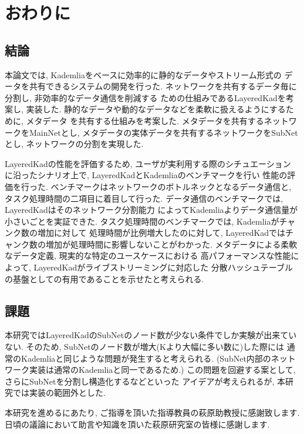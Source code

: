 \documentclass[sotsuron]{jcsie}
\begin{document}

\chapter{おわりに}
\section{結論}
本論文では, Kademliaをベースに効率的に静的なデータやストリーム形式の
データを共有できるシステムの開発を行った.
ネットワークを共有するデータ毎に分割し, 非効率的なデータ通信を削減する
ための仕組みであるLayeredKadを考案し, 実装した.
静的なデータや動的なデータなどを柔軟に扱えるようにするために, メタデータ
を共有する仕組みを考案した.
メタデータを共有するネットワークをMainNetとし, 
メタデータの実体データを共有するネットワークをSubNetとし, 
ネットワークの分割を実現した.

LayeredKadの性能を評価するため, ユーザが実利用する際のシチュエーション
に沿ったシナリオ上で, LayeredKadとKademliaのベンチマークを行い
性能の評価を行った.
ベンチマークはネットワークのボトルネックとなるデータ通信と, 
タスク処理時間の二項目に着目して行った.
データ通信のベンチマークでは, LayeredKadはそのネットワーク分割能力
によってKademliaよりデータ通信量が小さいごとを実証できた.
タスク処理時間のベンチマークでは, Kademliaがチャンク数の増加に対して
処理時間が比例増大したのに対して, 
LayeredKadではチャンク数の増加が処理時間に影響しないことがわかった.
メタデータによる柔軟なデータ定義, 現実的な特定のユースケースにおける
高パフォーマンスな性能によって, LayeredKadがライブストリーミングに対応した
分散ハッシュテーブルの基盤としての有用であることを示せたと考えられる.

\section{課題}
本研究ではLayeredKadのSubNetのノード数が少ない条件でしか実験が出来ていない.
そのため, SubNetのノード数が増大(Kより大幅に多い数に)した際には
通常のKademliaと同じような問題が発生すると考えられる.
(SubNet内部のネットワーク実装は通常のKademliaと同一であるため.)
この問題を回避する案として, さらにSubNetを分割し構造化するなどといった
アイデアが考えられるが, 本研究では実装の範囲外とした.

\begin{acknowledgment}
	本研究を進めるにあたり, ご指導を頂いた指導教員の萩原助教授に感謝致します.
	日頃の議論において助言や知識を頂いた萩原研究室の皆様に感謝します.
\end{acknowledgment}



\end{document}

